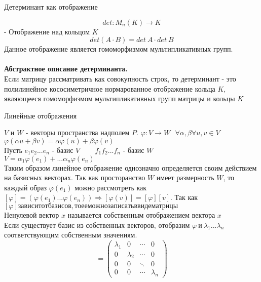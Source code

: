 \begin{title}
  Детерминант как отображение
\end{title}

\[det: M_n(K) \to K\]
- Отображение над кольцом $K$
\[det(A\cdot B) = det~A \cdot det~B\]
Данное отображение является гомоморфизмом мультипликативных групп.\\

\\

{\bf Абстрактное описание детерминанта.}\\
Если матрицу рассматривать как совокупность строк, то детерминант - это
полилинейное кососиметричное нормарованное отображение кольца $K$, являющееся
гомоморфизмом мультипликативных групп матрицы и кольцы $K$\\

\begin{title}
  Линейные отображения
\end{title}

$V$ и $W$ - векторы пространства надполем $P$. $\varphi: V \to W ~~~ \forall
\alpha, \beta \forall u, v \in V$\\
$\varphi(\alpha u + \beta v) = \alpha\varphi(u) + \beta\varphi(v)$\\
Пусть $e_1 e_2 ... e_n$ - базис $V$ ~~~ $f_1 f_2 ... f_n$ - базис $W$\\
$V = \alpha_1 \varphi(e_1) + ... \alpha_n \varphi(e_n)$\\
Таким образом линейное отображение однозначно определяется своим действием на
базисных векторах. Так как просторанство $W$ имеет размерность $W$, то каждый
образ $\varphi(e_1)$ можно рассмотреть как $[\varphi] = (\varphi(e_1) ...
\varphi(e_n)) \Rightarrow [\varphi(v)] = [\varphi][v]$. Так как $[\varphi]
зависит от базисов, то ее можно записать в виде матрицы$\\
Ненулевой вектор $x$ называется собственным отображением вектора $x$\\
Если существует базис из собственных векторов, отобразим $\varphi ~и~ \lambda_1
... \lambda_n$ соответствующим собственным значениям.
\begin{displaymath}
[\varphi] = \left(\begin{array}{lccr}
\lambda_1 & 0 & \cdots & 0\\
0 & \lambda_2 & \cdots & 0\\
0 & 0 & \ddots & 0\\
0 & 0 & \cdots & \lambda_n
\end{array}\right)
\end{displaymath}

